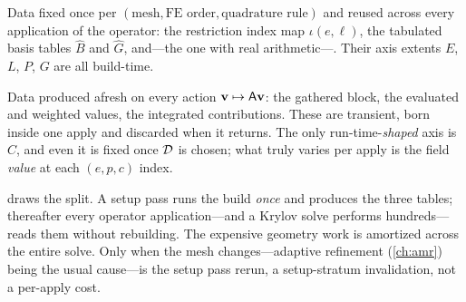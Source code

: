 \begin{description}[leftmargin=1.4em, style=nextline]
\item[Build-time (setup) stratum.] Data fixed once per
$(\text{mesh},\text{FE order},\text{quadrature rule})$ and reused across every
application of the operator: the restriction index map $\iota(e,\ell)$, the
tabulated basis tables $\hat B$ and $\hat G$, and---the one with real
arithmetic---. Their axis extents $E$, $L$, $P$, $G$ are all
build-time.
\item[Run-time (apply) stratum.] Data produced afresh on every action
$\mathbf{v}\mapsto\mathsf{A}\mathbf{v}$: the gathered \code{[(E, L)]} block, the evaluated and
weighted \code{[(E, P, C)]} values, the integrated contributions. These are
transient, born inside one apply and discarded when it returns. The only
run-time-\emph{shaped} axis is $C$, and even it is fixed once $\mathcal{D}$ is chosen;
what truly varies per apply is the field \emph{value} at each $(e,p,c)$ index.
\end{description}

 draws the split. A setup pass runs the build \emph{once} and
produces the three tables; thereafter every operator application---and a Krylov
solve performs hundreds---reads them without rebuilding. The expensive geometry
work is amortized across the entire solve. Only when the mesh changes---adaptive
refinement (\cref{ch:amr}) being the usual cause---is the setup pass rerun, a
setup-stratum invalidation, not a per-apply cost.

